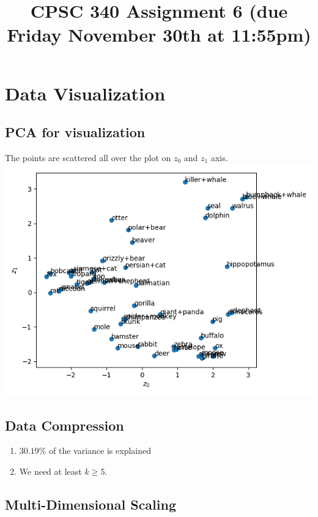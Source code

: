 \documentclass{article}
\def\enum#1{\begin{enumerate}#1\end{enumerate}}
\begin{document}
\title{CPSC 340 Assignment 6 (due Friday November 30th at 11:55pm)}
\date{}
\maketitle

\vspace{-7em}

\section{Data Visualization}

\subsection{PCA for visualization}

The points are scattered all over the plot on $z_0$ and $z_1$ axis.\\
\includegraphics[scale = 0.5]{PCAvis11.png}\\

\subsection{Data Compression}

\enum{
\item $30.19\%$ of the variance is explained
\item We need at least $k \geq 5$. 
}


\subsection{Multi-Dimensional Scaling}
\end{document}
